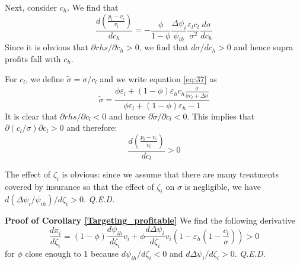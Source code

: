 \documentclass[a4paper,12pt]{article}
\newcommand{\qed}{\hspace*{\fill} {\em Q.E.D.}}
\begin{document}
Next, consider \(c_h\). We find that
\begin{equation}
\label{eq:57}
\frac{d\left(\frac{p_i-v_i}{v_i} \right)}{d c_h} = - \frac{\phi}{1-\phi} \frac{\Delta \psi_i}{\psi_{ih}} \frac{\varepsilon_l c_l}{\sigma^2} \frac{d\sigma}{d c_h}
\end{equation}
Since it is obvious that \(\partial rhs/\partial c_h >0\), we find that \(d\sigma/dc_h>0\) and hence supra profits fall with \(c_h\).

For \(c_l\), we define \(\tilde \sigma = \sigma/c_l\) and we write equation \eqref{eq:37} as
\begin{equation}
\label{eq:64}
\tilde \sigma = \frac{\phi \varepsilon_l +(1-\phi) \varepsilon_h c_h \frac{\tilde \sigma}{\tilde \sigma c_l + \Delta \sigma} }{\phi \varepsilon_l +(1-\phi) \varepsilon_h-1}
\end{equation}
It is clear that \(\partial rhs/\partial c_l <0\) and hence \(\partial \tilde \sigma /\partial c_l <0\). This implies that \(\partial (c_l/\sigma)\partial c_l > 0\) and therefore:
\begin{equation}
\label{eq:65}
\frac{d\left(\frac{p_i-v_i}{v_i} \right)}{dc_l} >0
\end{equation}

The effect of \(\zeta_i\) is obvious: since we assume that there are many treatments covered by insurance so that the effect of \(\zeta_i\) on \(\sigma\) is negligible, we have \(d(\Delta\psi_i/\psi_{ih})/d\zeta_i>0\). 
 \qed

\textbf{Proof of Corollary \ref{Targeting_profitable}}
We find the following derivative
\begin{equation}
\label{eq:66}
\frac{d \pi_i}{d \zeta_i} = (1-\phi) \frac{d \psi_{ih}}{d\zeta_i} v_i+\phi \frac{d\Delta\psi_i}{d\zeta_i}v_i (1-\varepsilon_h(1-\frac{c_l}{\sigma})) > 0
\end{equation}
for \(\phi\) close enough to 1 because \(d\psi_{ih}/d\zeta_{i}<0\) and \(d\Delta\psi_i/d\zeta_i>0\). 
 \qed
\end{document}
